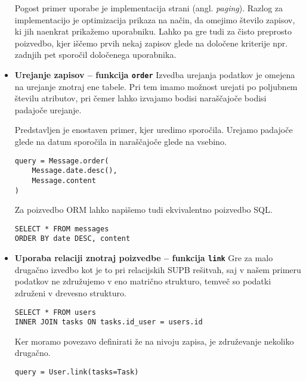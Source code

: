 \documentclass[a4paper,12pt,openright]{book}
\begin{document}
\begin{itemize}
        Pogost primer uporabe je implementacija strani (angl. \textit{paging}). Razlog za implementacijo je optimizacija prikaza na način, da omejimo število zapisov, ki jih naenkrat prikažemo uporabniku. Lahko pa gre tudi za čisto preprosto poizvedbo, kjer iščemo prvih nekaj zapisov glede na določene kriterije npr. zadnjih pet sporočil določenega uporabnika.
        
        \item \textbf{Urejanje zapisov – funkcija {\tt order}} 
        \newline
        \noindent
        Izvedba urejanja podatkov je omejena na urejanje znotraj ene tabele. Pri tem imamo možnost urejati po poljubnem številu atributov, pri čemer lahko izvajamo bodisi naraščajoče bodisi padajoče urejanje.

        Predstavljen je enostaven primer, kjer uredimo sporočila. Urejamo padajoče glede na datum sporočila in naraščajoče glede na vsebino.

\begin{verbatim}
query = Message.order(
    Message.date.desc(),
    Message.content
)
\end{verbatim}    

        \noindent
        Za poizvedbo ORM lahko napišemo tudi ekvivalentno poizvedbo SQL.

\begin{verbatim}
SELECT * FROM messages
ORDER BY date DESC, content
\end{verbatim}          

        \item \textbf{Uporaba relaciji znotraj poizvedbe – funkcija {\tt link}}
        \newline
        \noindent
        Gre za malo drugačno izvedbo kot je to pri relacijskih SUPB rešitvah, saj v našem primeru podatkov ne združujemo v eno matrično strukturo, temveč so podatki združeni v drevesno strukturo.

\begin{verbatim}
SELECT * FROM users
INNER JOIN tasks ON tasks.id_user = users.id
\end{verbatim}

        \noindent
        Ker moramo povezavo definirati že na nivoju zapisa, je združevanje nekoliko drugačno.

\begin{verbatim}
query = User.link(tasks=Task)
\end{verbatim}


\end{itemize}
\end{document}
